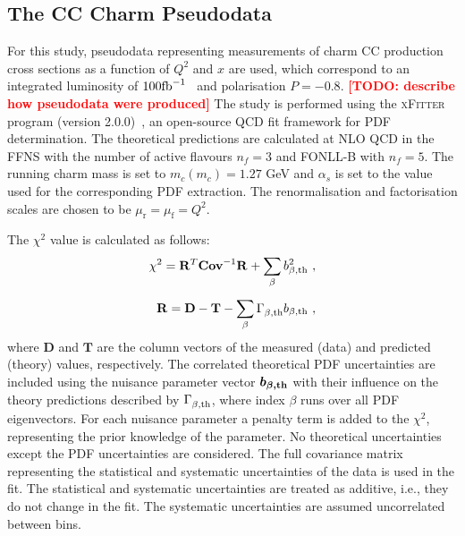 \documentclass[pdftex,twocolumn,epjc3]{svjour3}          %
\newcommand{\chisq}{\ensuremath{\chi^2}\xspace}
\newcommand{\xfitter} {\textsc{xFitter}\xspace}
\begin{document}
\subsection{The CC  Charm Pseudodata}
\label{sec:pseudodata}

For this study, pseudodata representing measurements of charm CC
production cross sections as a function of $Q^2$ and $x$ are
used, which correspond to an integrated luminosity of $100{\rm fb}^{-1}$~\cite{AbelleiraFernandez:2012cc} and polarisation $P=-0.8$.
%
\textcolor{red}{\bf [TODO: describe how pseudodata were produced]}
%
The study is
performed using the \xfitter program (version
2.0.0)~\cite{Alekhin:2014irh}, an open-source QCD fit framework for
PDF determination. The theoretical predictions are calculated at NLO
QCD in the FFNS with the number of active flavours $n_f = 3$ and
FONLL-B with $n_f = 5$. The running charm mass is set to $m_c(m_c) =
1.27$ GeV and $\alpha_s$ is set to the value used for the
corresponding PDF extraction.  The renormalisation and factorisation
scales are chosen to be $\mu_\mathrm{r} = \mu_\mathrm{f} = Q^2$.

The \chisq value is calculated as follows:
\begin{equation}
\begin{split}
  \chisq = \mathbf{R}^{T}_{} \mathbf{Cov}^{-1}_{} \mathbf{R}_{} + \sum_{\beta} b_{\beta,\rm th}^2 \ , \\[5pt]
  \mathbf{R} = \mathbf{D} - \mathbf{T} - \sum_{\beta} \Gamma^{}_{\beta,\rm th} b_{\beta,\rm th} \ ,
\label{eq:chisq}
\end{split}
\end{equation}
%
where $\mathbf{D}$ and $\mathbf{T}$ are the column vectors of the
measured (data) and predicted (theory) values, respectively.  The
correlated theoretical PDF uncertainties are included using the
nuisance parameter vector $\boldsymbol{b_{\beta, \rm th}}$ with their
influence on the theory predictions described by $\Gamma^{}_{\beta,\rm th}$,
where index $\beta$ runs over all PDF eigenvectors.  For each
nuisance parameter a penalty term is added to the \chisq, representing
the prior knowledge of the parameter.  No theoretical uncertainties
except the PDF uncertainties are considered.  The full covariance
matrix representing the statistical and systematic uncertainties of
the data is used in the fit. The statistical and systematic
uncertainties are treated as additive, i.e., they do not change in the
fit. The systematic uncertainties are assumed uncorrelated between
bins.
\end{document}
